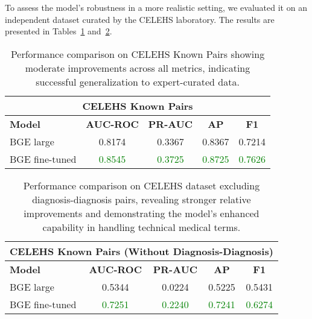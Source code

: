 To assess the model's robustness in a more realistic setting, we evaluated it on an independent dataset curated by the CELEHS laboratory. The results are presented in Tables~\ref{tab:celehs_results} and~\ref{tab:celehs_nodx_results}.

\begin{table}[h]
    \centering
    \begin{tabular}{|l|c|c|c|c|}
        \hline
        \multicolumn{5}{|c|}{\textbf{CELEHS Known Pairs}} \\
        \hline
        \textbf{Model} & \textbf{AUC-ROC} & \textbf{PR-AUC} & \textbf{AP} & \textbf{F1} \\
        \hline
        BGE large & 0.8174 & 0.3367 & 0.8367 & 0.7214 \\
        BGE fine-tuned & \textcolor{green}{0.8545} & \textcolor{green}{0.3725} & \textcolor{green}{0.8725} & \textcolor{green}{0.7626} \\
        \hline
    \end{tabular}
    \caption{Performance comparison on CELEHS Known Pairs showing moderate improvements across all metrics, indicating successful generalization to expert-curated data.}
    \label{tab:celehs_results}
\end{table}

\begin{table}[h]
    \centering
    \begin{tabular}{|l|c|c|c|c|}
        \hline
        \multicolumn{5}{|c|}{\textbf{CELEHS Known Pairs (Without Diagnosis-Diagnosis)}} \\
        \hline
        \textbf{Model} & \textbf{AUC-ROC} & \textbf{PR-AUC} & \textbf{AP} & \textbf{F1} \\
        \hline
        BGE large & 0.5344 & 0.0224 & 0.5225 & 0.5431 \\
        BGE fine-tuned & \textcolor{green}{0.7251} & \textcolor{green}{0.2240} & \textcolor{green}{0.7241} & \textcolor{green}{0.6274} \\
        \hline
    \end{tabular}
    \caption{Performance comparison on CELEHS dataset excluding diagnosis-diagnosis pairs, revealing stronger relative improvements and demonstrating the model's enhanced capability in handling technical medical terms.}
    \label{tab:celehs_nodx_results}
\end{table}

